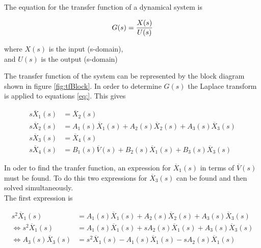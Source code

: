 \documentclass[a4paper,10pt,reqno]{amsart}
\numberwithin{equation}{section}
\begin{document}
The equation for the transfer function of a dynamical system is

\begin{equation}
     G(s) = \frac{X(s)}{U(s)} \label{eq:TF} \\
\end{equation}

\begin{center}
     where $X(s)$ is the input (s-domain), \\
     and $U(s)$ is the output (s-domain)
\end{center}
\vspace{10pt}

The transfer function of the system can be represented by the block diagram shown in figure \ref{fig:tfBlock}. In order to determine $G(s)$ the Laplace transform is applied to equations \ref{eq:}. This gives

\setlength{\jot}{5pt} %

\begin{subequations} \label{eq:SysLT}
    \begin{align}
         s\overline{X}_1(s) &= \overline{X}_2(s) \label{eq:sX1} \\
         s\overline{X}_2(s) &= A_1(s)\overline{X}_1(s) + A_2(s)\overline{X}_2(s) + A_3(s)\overline{X}_3(s) \label{eq:sX2} \\
         s\overline{X}_3(s) &= \overline{X}_4(s) \label{eq:sX3} \\
         s\overline{X}_4(s) &= B_1(s)\overline{V}(s) + B_2(s)\overline{X}_1(s) + B_3(s)\overline{X}_3(s) \label{eq:sX4}
    \end{align}
\end{subequations}
\vspace{1pt}

In oder to find the tranfer function, an expression for $\overline{X}_1(s)$ in terms of $\overline{V}(s)$ must be found. To do this two expressions for $\overline{X}_3(s)$ can be found and then solved simultaneously.\\
The first expression is

\begin{align*}
     s^2\overline{X}_1(s) &= A_1(s)\overline{X}_1(s) + A_2(s)\overline{X}_2(s) + A_3(s)\overline{X}_3(s) \\
     \iff s^2\overline{X}_1(s) &= A_1(s)\overline{X}_1(s) + sA_2(s)\overline{X}_1(s) + A_3(s)\overline{X}_3(s) \\
     \iff A_3(s)\overline{X}_3(s) &= s^2\overline{X}_1(s) - A_1(s)\overline{X}_1(s) - sA_2(s)\overline{X}_1(s)
\end{align*}
\vspace{1pt}
\end{document}
